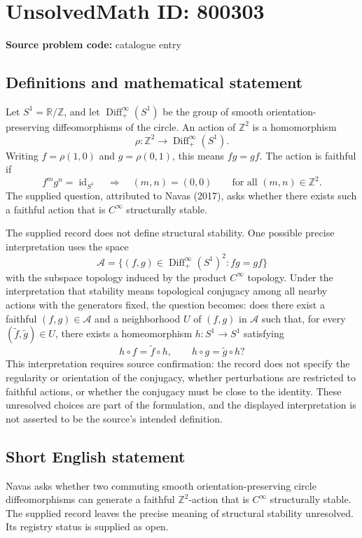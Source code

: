 \documentclass[11pt]{article}
\newcommand{\Z}{\mathbb{Z}}
\newcommand{\R}{\mathbb{R}}
\begin{document}
\section*{UnsolvedMath ID: 800303}
\textbf{Source problem code:} catalogue entry
\subsection{Definitions and mathematical statement}
Let \(S^1=\R/\Z\), and let \(\operatorname{Diff}^{\infty}_{+}(S^1)\) be the group of smooth orientation-preserving diffeomorphisms of the circle. An action of \(\Z^2\) is a homomorphism
\[
\rho:\Z^2\longrightarrow\operatorname{Diff}^{\infty}_{+}(S^1).
\]
Writing \(f=\rho(1,0)\) and \(g=\rho(0,1)\), this means \(fg=gf\). The action is faithful if
\[
 f^m g^n=\operatorname{id}_{S^1}\quad\Longrightarrow\quad(m,n)=(0,0)
 \qquad\text{for all }(m,n)\in\Z^2.
\]
The supplied question, attributed to Navas (2017), asks whether there exists such a faithful action that is \(C^{\infty}\) structurally stable.

The supplied record does not define structural stability. One possible precise interpretation uses the space
\[
\mathcal A=\{(f,g)\in\operatorname{Diff}^{\infty}_{+}(S^1)^2:fg=gf\}
\]
with the subspace topology induced by the product \(C^{\infty}\) topology. Under the interpretation that stability means topological conjugacy among all nearby actions with the generators fixed, the question becomes: does there exist a faithful \((f,g)\in\mathcal A\) and a neighborhood \(U\) of \((f,g)\) in \(\mathcal A\) such that, for every \((\widetilde f,\widetilde g)\in U\), there exists a homeomorphism \(h:S^1\to S^1\) satisfying
\[
 h\circ f=\widetilde f\circ h,
 \qquad
 h\circ g=\widetilde g\circ h?
\]
This interpretation requires source confirmation: the record does not specify the regularity or orientation of the conjugacy, whether perturbations are restricted to faithful actions, or whether the conjugacy must be close to the identity. These unresolved choices are part of the formulation, and the displayed interpretation is not asserted to be the source's intended definition.
\subsection{Short English statement}
Navas asks whether two commuting smooth orientation-preserving circle diffeomorphisms can generate a faithful \(\Z^2\)-action that is \(C^{\infty}\) structurally stable. The supplied record leaves the precise meaning of structural stability unresolved. Its registry status is supplied as open.
\end{document}
